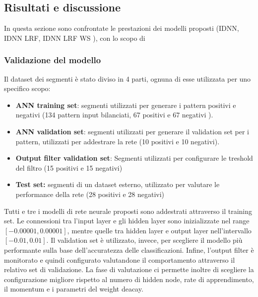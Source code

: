 \documentclass[12pt]{article}
\begin{document}
 		\subsection{Risultati e discussione}
 			In questa sezione sono confrontate le prestazioni dei modelli proposti (IDNN, IDNN LRF, IDNN LRF WS ), con lo scopo di 
 			\subsubsection{Validazione del modello}
 				Il dataset dei segmenti è stato diviso in 4 parti, ognuna di esse utilizzata per uno specifico scopo:
 				\begin{itemize}
 					\item \textbf{ANN training set}: segmenti utilizzati per generare i pattern positivi e negativi (134 pattern input bilanciati, 67 positivi e 67 negativi ).
 					\item \textbf{ANN validation set}: segmenti utilizzati per generare il validation set per i pattern, utilizzati per addestrare la rete (10 positivi e 10 negativi).
 					\item \textbf{Output filter validation set}: Segmenti utilizzati per configurare le treshold del filtro (15 positivi e 15 negativi)
 					\item \textbf{Test set:} segmenti di un dataset esterno, utilizzato per valutare le performance della rete (28 positivi e 28 negativi)
 				\end{itemize}
 				Tutti e tre i modelli di rete neurale proposti sono addestrati attraverso il training set. Le connessioni tra l'input layer e gli hidden layer sono inizializzate nel range $[-0.00001, 0.00001] $, mentre quelle tra hidden layer e output layer nell'intervallo $[-0.01, 0.01] $. Il validation set è utilizzato, invece, per scegliere il modello più performante sulla base dell'accuratezza delle classificazioni. Infine, l'output filter è monitorato e quindi configurato valutandone il comportamento attraverso il relativo set di validazione. La fase di valutazione ci permette inoltre di scegliere la configurazione migliore rispetto al numero di hidden node, rate di apprendimento, il momentum e i parametri del weight deacay.
\end{document}
